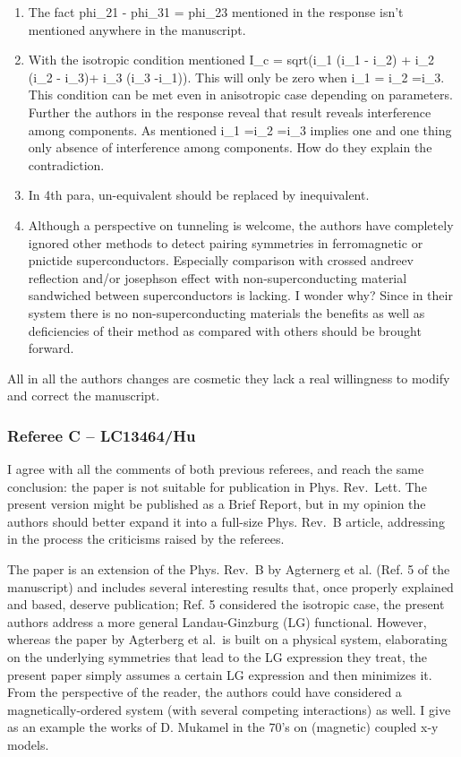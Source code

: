 \documentclass[11pt]{article}
\begin{document}
\begin{enumerate}
\def\labelenumi{\arabic{enumi}.}
\item
  The fact phi\_21 - phi\_31 = phi\_23 mentioned in the response isn't
  mentioned anywhere in the manuscript.
\item
  With the isotropic condition mentioned I\_c = sqrt(i\_1 (i\_1 - i\_2)
  + i\_2 (i\_2 - i\_3)+ i\_3 (i\_3 -i\_1)). This will only be zero when
  i\_1 = i\_2 =i\_3. This condition can be met even in anisotropic case
  depending on parameters. Further the authors in the response reveal
  that result reveals interference among components. As mentioned i\_1
  =i\_2 =i\_3 implies one and one thing only absence of interference
  among components. How do they explain the contradiction.
\item
  In 4th para, un-equivalent should be replaced by inequivalent.
\item
  Although a perspective on tunneling is welcome, the authors have
  completely ignored other methods to detect pairing symmetries in
  ferromagnetic or pnictide superconductors. Especially comparison with
  crossed andreev reflection and/or josephson effect with
  non-superconducting material sandwiched between superconductors is
  lacking. I wonder why? Since in their system there is no
  non-superconducting materials the benefits as well as deficiencies of
  their method as compared with others should be brought forward.
\end{enumerate}

All in all the authors changes are cosmetic they lack a real willingness
to modify and correct the manuscript.

\hypertarget{referee-c-lc13464hu}{%
\subsubsection{Referee C -- LC13464/Hu}\label{referee-c-lc13464hu}}

I agree with all the comments of both previous referees, and reach the
same conclusion: the paper is not suitable for publication in Phys.
Rev.~Lett. The present version might be published as a Brief Report, but
in my opinion the authors should better expand it into a full-size Phys.
Rev.~B article, addressing in the process the criticisms raised by the
referees.

The paper is an extension of the Phys. Rev.~B by Agternerg et al. (Ref.
5 of the manuscript) and includes several interesting results that, once
properly explained and based, deserve publication; Ref. 5 considered the
isotropic case, the present authors address a more general
Landau-Ginzburg (LG) functional. However, whereas the paper by Agterberg
et al.~is built on a physical system, elaborating on the underlying
symmetries that lead to the LG expression they treat, the present paper
simply assumes a certain LG expression and then minimizes it. From the
perspective of the reader, the authors could have considered a
magnetically-ordered system (with several competing interactions) as
well. I give as an example the works of D. Mukamel in the 70's on
(magnetic) coupled x-y models.
\end{document}
